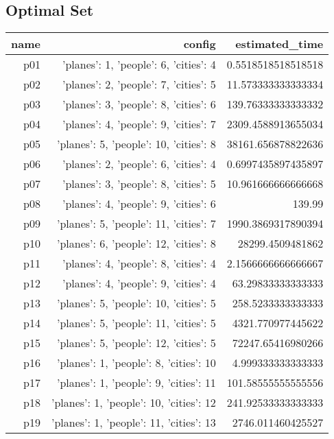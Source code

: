 \documentclass{article}
\begin{document}
                                \subsection*{Optimal Set}
                                
                            \begin{center}
                            \scriptsize
                            \begin{tabular}{r|r|r}
                            name & config & estimated\_time\\\midrule
                              p01&{'planes': 1, 'people': 6, 'cities': 4}&0.5518518518518518\\
  p02&{'planes': 2, 'people': 7, 'cities': 5}&11.573333333333334\\
  p03&{'planes': 3, 'people': 8, 'cities': 6}&139.76333333333332\\
  p04&{'planes': 4, 'people': 9, 'cities': 7}&2309.4588913655034\\
  p05&{'planes': 5, 'people': 10, 'cities': 8}&38161.656878822636\\
  p06&{'planes': 2, 'people': 6, 'cities': 4}&0.6997435897435897\\
  p07&{'planes': 3, 'people': 8, 'cities': 5}&10.961666666666668\\
  p08&{'planes': 4, 'people': 9, 'cities': 6}&139.99\\
  p09&{'planes': 5, 'people': 11, 'cities': 7}&1990.3869317890394\\
  p10&{'planes': 6, 'people': 12, 'cities': 8}&28299.4509481862\\
  p11&{'planes': 4, 'people': 8, 'cities': 4}&2.1566666666666667\\
  p12&{'planes': 4, 'people': 9, 'cities': 4}&63.29833333333333\\
  p13&{'planes': 5, 'people': 10, 'cities': 5}&258.5233333333333\\
  p14&{'planes': 5, 'people': 11, 'cities': 5}&4321.770977445622\\
  p15&{'planes': 5, 'people': 12, 'cities': 5}&72247.65416980266\\
  p16&{'planes': 1, 'people': 8, 'cities': 10}&4.999333333333333\\
  p17&{'planes': 1, 'people': 9, 'cities': 11}&101.58555555555556\\
  p18&{'planes': 1, 'people': 10, 'cities': 12}&241.92533333333333\\
  p19&{'planes': 1, 'people': 11, 'cities': 13}&2746.011460425527\\

\end{tabular}
\end{center}
\end{document}
